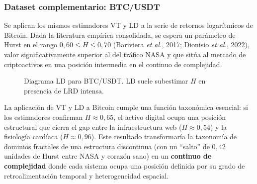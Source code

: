 \subsubsection{Dataset complementario: BTC/USDT}

Se aplican los mismos estimadores VT y LD a la serie de retornos logarítmicos
de Bitcoin. Dada la literatura empírica consolidada, se espera un parámetro de
Hurst en el rango $0{,}60 \le H \le 0{,}70$ (Bariviera \textit{et al.}, 2017;
Dionisio \textit{et al.}, 2022), valor significativamente superior al del
tráfico NASA y que sitúa al mercado de criptoactivos en una posición
intermedia en el continuo de complejidad.

\begin{figure}[H]
    \centering
    \begin{minipage}[t]{0.48\textwidth}
        \centering
        \caption{Diagrama VT para BTC/USDT. Se espera $\hat{H}_{\text{VT}} \in [0{,}60; 0{,}70]$.}
        \label{fig:btc-vt}
    \end{minipage}
    \hfill
    \begin{minipage}[t]{0.48\textwidth}
        \centering
        \caption{Diagrama LD para BTC/USDT. LD suele subestimar $H$ en presencia de LRD intensa.}
        \label{fig:btc-ld}
    \end{minipage}
\end{figure}

La aplicación de VT y LD a Bitcoin cumple una función taxonómica esencial: si
los estimadores confirman $H \approx 0{,}65$, el activo digital ocupa una
posición estructural que cierra el gap entre la infraestructura web
($H \approx 0{,}54$) y la fisiología cardíaca ($H \approx 0{,}96$).
Este resultado transformaría la taxonomía de dominios fractales de una
estructura discontinua (con un ``salto'' de $0{,}42$ unidades de Hurst entre
NASA y corazón sano) en un \textbf{continuo de complejidad} donde cada sistema
ocupa una posición definida por su grado de retroalimentación temporal y
heterogeneidad espacial.

